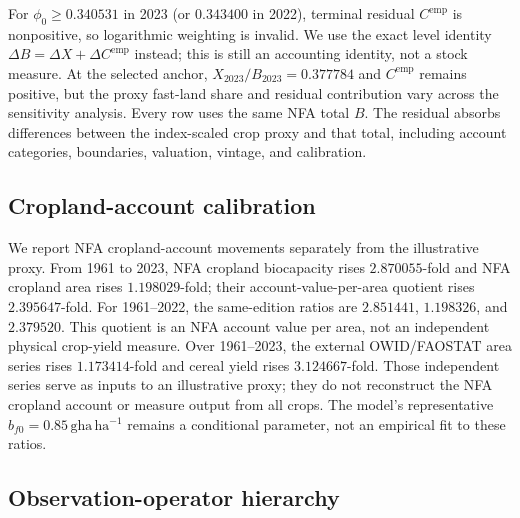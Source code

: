 \documentclass[11pt,a4paper]{article}
\begin{document}
For $\phi_0\ge0.340531$ in 2023 (or $0.343400$ in 2022), terminal residual $C^{\mathrm{emp}}$ is nonpositive, so logarithmic weighting is invalid. We use the exact level identity $\Delta B=\Delta X+\Delta C^{\mathrm{emp}}$ instead; this is still an accounting identity, not a stock measure. At the selected anchor, $X_{2023}/B_{2023}=0.377784$ and $C^{\mathrm{emp}}$ remains positive, but the proxy fast-land share and residual contribution vary across the sensitivity analysis. Every row uses the same NFA total $B$. The residual absorbs differences between the index-scaled crop proxy and that total, including account categories, boundaries, valuation, vintage, and calibration.

\subsection{Cropland-account calibration}\label{si:cropland}

We report NFA cropland-account movements separately from the illustrative proxy. From 1961 to 2023, NFA cropland biocapacity rises $2.870055$-fold and NFA cropland area rises $1.198029$-fold; their account-value-per-area quotient rises $2.395647$-fold. For 1961--2022, the same-edition ratios are $2.851441$, $1.198326$, and $2.379520$. This quotient is an NFA account value per area, not an independent physical crop-yield measure. Over 1961--2023, the external OWID/FAOSTAT area series rises $1.173414$-fold and cereal yield rises $3.124667$-fold. Those independent series serve as inputs to an illustrative proxy; they do not reconstruct the NFA cropland account or measure output from all crops. The model's representative $b_{f0}=0.85\,\mathrm{gha\,ha^{-1}}$ remains a conditional parameter, not an empirical fit to these ratios.

\subsection{Observation-operator hierarchy}\label{si:operator}
\end{document}
